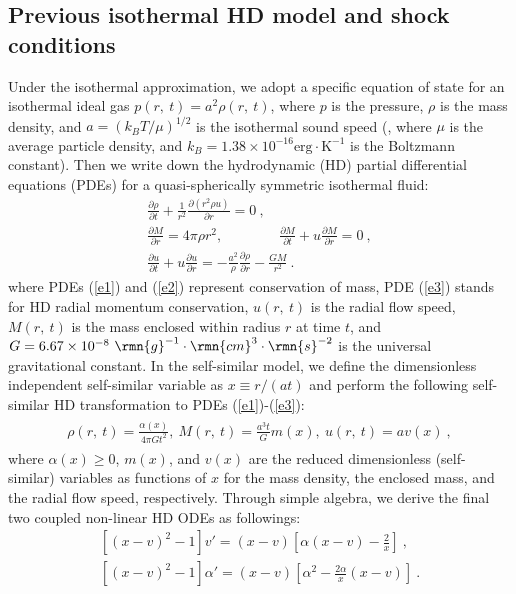 \documentclass[fleqn,usenatbib]{mnras}
\begin{document}
\subsection{Previous isothermal HD model and shock conditions}
\label{s1.1}
Under the isothermal approximation, we adopt a specific equation of state for an isothermal ideal gas $p(r,\ t)=a^{2}\rho(r,\ t)$, where $p$ is the pressure, $\rho$ is the mass density, and $a=\left(k_{B}T/\mu\right)^{1/2}$ is the isothermal sound speed (, where $\mu$ is the average particle density, and $k_{B}=1.38\times 10^{-16}\mathrm{erg\cdot K^{-1}}$ is the Boltzmann constant). Then we write down the hydrodynamic (HD) partial differential equations (PDEs) for a quasi-spherically symmetric isothermal fluid:
\begin{gather}
\frac{\partial\rho}{\partial t}+\frac{1}{r^{2}}\frac{\partial
  \left(r^{2}\rho u\right)}{\partial r}=0\ ,\label{e1}\\
\frac{\partial M}{\partial r}=4\pi\rho r^{2},
 \qquad\qquad \frac{\partial M}
  {\partial t}+u\frac{\partial M}{\partial r}=0\ ,\label{e2}\\
\frac{\partial u}{\partial t}+u\frac{\partial u}{\partial r}=-\frac{a^{2}}{\rho}\frac{\partial \rho}
 {\partial r}-\frac{GM}{r^{2}}\ .\label{e3}
\end{gather}
where PDEs (\ref{e1}) and (\ref{e2}) represent conservation of mass, PDE (\ref{e3}) stands for HD radial momentum conservation, $u(r,\ t)$ is the radial flow speed, $M(r,\ t)$ is the mass enclosed within radius $r$ at time $t$, and $G=6.67\times 10^{-8}~\rmn{g}^{-1}\cdot\rmn{cm}^{3}\cdot\rmn{s}^{-2}$ is the universal gravitational constant. 
In the self-similar model, we define the dimensionless independent self-similar variable as $x\equiv r/(at)$ and perform the following self-similar HD transformation to PDEs (\ref{e1})-(\ref{e3}):
\begin{gather}
\begin{split}
\rho(r,\ t)=\frac{\alpha(x)}{4\pi Gt^{2}},\ M(r,\ t)=\frac{a^{3}t}{G}m(x),\ u(r,\ t)=av(x)\ ,
\end{split}\label{e4}
\end{gather}
where $\alpha(x)\geq 0$, $m(x)$, and $v(x)$ are the reduced dimensionless (self-similar) variables as functions of $x$ for the mass density, the enclosed mass, and the radial flow speed, respectively. 
Through simple algebra, we derive the final two coupled non-linear HD ODEs as followings:
\begin{gather}
\left[(x-v)^{2}-1\right]v'=(x-v)
 \left[\alpha (x-v)-\frac{2}{x}\right]\ ,\label{e5}\\
\left[(x-v)^{2}-1\right]\alpha'=(x-v)\left[\alpha^{2}-\frac{2\alpha}{x}
 \left(x-v\right)\right]\ .\label{e6}
\end{gather}
\end{document}
